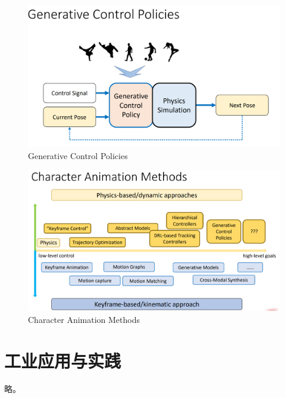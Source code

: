 \documentclass[lang=cn,newtx,10pt,scheme=chinese]{elegantbook}
\begin{document}
\begin{figure}[htbp]
  \centering
  \includegraphics[totalheight=1.5in]{"./image/GenerativeControlPolicies.png"}
  \caption{Generative Control Policies} \label{fig:GenerativeControlPolicies}
\end{figure}

\begin{figure}[htbp]
  \centering
  \includegraphics[totalheight=2in]{"./image/CharacterAnimationMethods.png"}
  \caption{Character Animation Methods} \label{fig:CharacterAnimationMethods}
\end{figure}


\section{工业应用与实践}
略。
\end{document}

